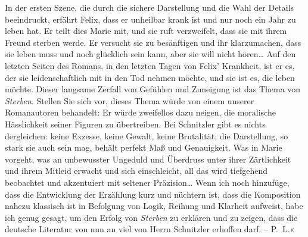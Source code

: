 {{{{{                           In der ersten Szene, die durch die sichere Darstellung und die Wahl der
                           Details beeindruckt, erfährt Felix, dass er unheilbar krank ist und nur noch
                           ein Jahr zu leben hat. Er teilt dies Marie mit, und sie ruft verzweifelt, dass sie mit
                           ihrem Freund sterben werde. Er versucht sie zu besänftigen und ihr
                           klarzumachen, dass sie leben muss und noch glücklich sein kann, aber sie
                           will nicht hören{\dots} Auf den letzten Seiten des
                              Romans, in den
                           letzten Tagen von Felix’ Krankheit, ist er es, der sie leidenschaftlich mit in den
                           Tod nehmen möchte, und sie ist es, die leben möchte. Dieser langsame
                           Zerfall von Gefühlen und Zuneigung ist das Thema von \emph{Sterben}. Stellen Sie sich vor, dieses Thema würde von einem unserer
                           Romanautoren behandelt: Er würde zweifellos dazu neigen, die moralische
                           Hässlichkeit seiner Figuren zu übertreiben. Bei Schnitzler gibt es nichts dergleichen: keine
                           Exzesse, keine Gewalt, keine Brutalität; die Darstellung, so stark sie
                           auch sein mag, behält perfekt Maß und Genauigkeit. Was in Marie vorgeht, was an
                           unbewusster Ungeduld und Überdruss unter ihrer Zärtlichkeit und ihrem
                           Mitleid erwacht und sich einschleicht, all das wird tiefgehend beobachtet
                           und akzentuiert mit seltener Präzision{\dots} Wenn
                           ich noch hinzufüge, dass die Entwicklung der Erzählung kurz und nüchtern
                           ist, dass die Komposition nahezu klassisch ist in Befolgung von Logik,
                           Reihung und Klarheit aufweist, habe ich genug gesagt, um den Erfolg von
                              \emph{Sterben} zu erklären und zu zeigen, dass die deutsche Literatur von nun an
                           viel von Herrn Schnitzler erhoffen
                           darf. – P. L.«}}}\label{K_L02731-1}}}\pend
           
